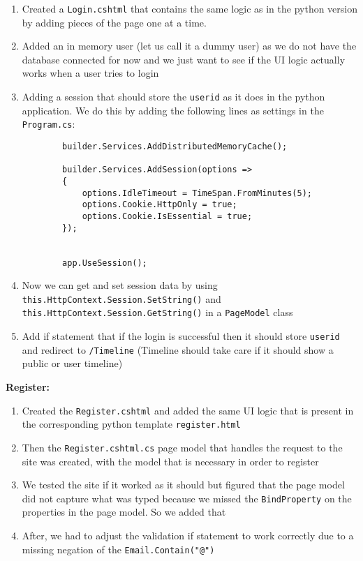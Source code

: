 \begin{enumerate}
    \item Created a \texttt{Login.cshtml} that contains the same logic as in the python version by adding pieces of the page one at a time.
    \item Added an in memory user (let us call it a dummy user) as we do not have the database connected for now and we just want to see if the UI logic actually works when a user tries to login
    \item Adding a session that should store the \texttt{userid} as it does in the python application. We do this by adding the following lines as settings in the \texttt{Program.cs}:

    \begin{verbatim}
        builder.Services.AddDistributedMemoryCache();

        builder.Services.AddSession(options =>
        {
            options.IdleTimeout = TimeSpan.FromMinutes(5);
            options.Cookie.HttpOnly = true;
            options.Cookie.IsEssential = true;
        });


        app.UseSession();
    \end{verbatim}
    \item Now we can get and set session data by using \texttt{this.HttpContext.Session.SetString()} and \texttt{this.HttpContext.Session.GetString()} in a \texttt{PageModel} class
    \item Add if statement that if the login is successful then it should store \texttt{userid} and redirect to \texttt{/Timeline} (Timeline should take care if it should show a public or user timeline)
\end{enumerate}

\textbf{Register:}

\begin{enumerate}
    \item Created the \texttt{Register.cshtml} and added the same UI logic that is present in the corresponding python template \texttt{register.html}
    \item Then the \texttt{Register.cshtml.cs} page model that handles the request to the site was created, with the model that is necessary in order to register
    \item We tested the site if it worked as it should but figured that the page model did not capture what was typed because we missed the \texttt{BindProperty} on the properties in the page model. So we added that
    \item After, we had to adjust the validation if statement to work correctly due to a missing negation of the \texttt{Email.Contain("@")}
\end{enumerate}

